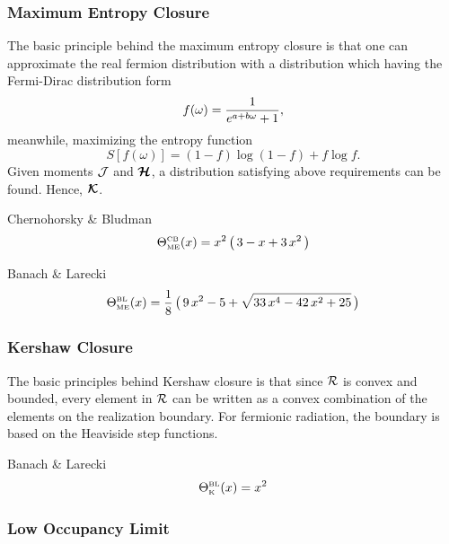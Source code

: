 \subsubsection{Maximum Entropy Closure}
The basic principle behind the maximum entropy closure is that one can approximate the real fermion distribution with a distribution which having the Fermi-Dirac distribution form 
\begin{equation}
f(\omega)=\frac{1}{e^{a + b\omega}+1}, 
\end{equation} 
meanwhile, maximizing the entropy function
\begin{equation}
S[f(\omega)] = (1-f)\log(1-f) + f\log f.
\end{equation} 
Given moments $\mathcal{J}$ and $\boldsymbol{\mathcal{H}}$, a distribution satisfying above requirements can be found. Hence, $\boldsymbol{\mathcal{K}}$.

Chernohorsky \& Bludman \cite{cernohorskyBludman_1994}
\begin{equation}
  \Theta_{\mbox{\tiny ME}}^{\mbox{\tiny CB}}(x)
  =x^{2}\,\big(\,3-x+3\,x^{2}\,\big)
\end{equation}

Banach \& Larecki \cite{banachLarecki_2017b}
\begin{equation}
  \Theta_{\mbox{\tiny ME}}^{\mbox{\tiny BL}}(x)
  =\frac{1}{8}\,\big(\,9\,x^{2}-5+\sqrt{33\,x^{4}-42\,x^{2}+25}\,\big)
\end{equation}

\subsubsection{Kershaw Closure}
The basic principles behind Kershaw closure is that since $\mathcal{R}$ is convex and bounded, every element in $\mathcal{R}$ can be written as a convex combination of the elements on the realization boundary.
For fermionic radiation, the boundary is based on the Heaviside step functions.

Banach \& Larecki \cite{banachLarecki_2017a}
\begin{equation}
  \Theta_{\mbox{\tiny K}}^{\mbox{\tiny BL}}(x)=x^{2}
\end{equation}

\subsubsection{Low Occupancy Limit}

